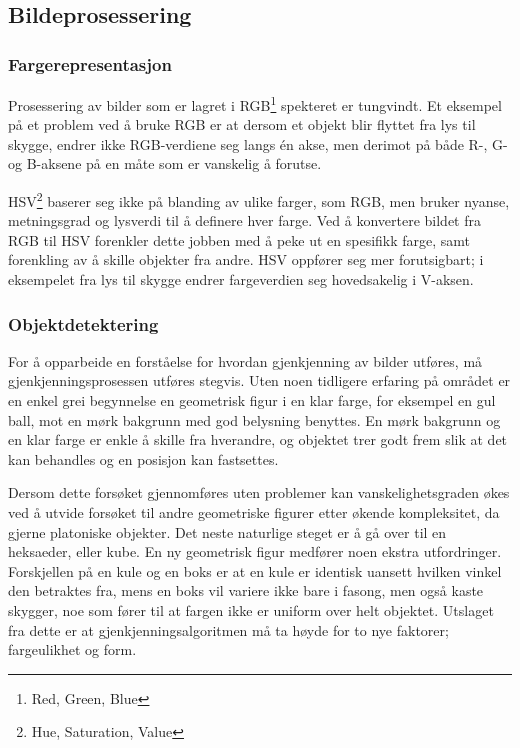 \subsection{Bildeprosessering}

\subsubsection{Fargerepresentasjon}
Prosessering av bilder som er lagret i RGB\footnote{Red, Green, Blue} spekteret er tungvindt. Et eksempel på et problem ved å bruke RGB er at dersom et objekt blir flyttet fra lys til skygge, endrer ikke RGB-verdiene seg langs én akse, men derimot på både R-, G- og B-aksene på en måte som er vanskelig å forutse.

HSV\footnote{Hue, Saturation, Value} baserer seg ikke på blanding av ulike farger, som RGB, men bruker nyanse, metningsgrad og lysverdi til å definere hver farge. Ved å konvertere bildet fra RGB til HSV forenkler dette jobben med å peke ut en spesifikk farge, samt forenkling av å skille objekter fra andre. HSV oppfører seg mer forutsigbart; i eksempelet fra lys til skygge endrer fargeverdien seg hovedsakelig i V-aksen. 

\subsubsection{Objektdetektering}
For å opparbeide en forståelse for hvordan gjenkjenning av bilder utføres, må gjenkjenningsprosessen utføres stegvis. Uten noen tidligere erfaring på området er en enkel grei begynnelse en geometrisk figur i en klar farge, for eksempel en gul ball, mot en mørk bakgrunn med god belysning benyttes. En mørk bakgrunn og en klar farge er enkle å skille fra hverandre, og objektet trer godt frem slik at det kan behandles og en posisjon kan fastsettes.

Dersom dette forsøket gjennomføres uten problemer kan vanskelighetsgraden økes ved å utvide forsøket til andre geometriske figurer etter økende kompleksitet, da gjerne platoniske objekter. Det neste naturlige steget er å gå over til en heksaeder, eller kube. En ny geometrisk figur medfører noen ekstra utfordringer. Forskjellen på en kule og en boks er at en kule er identisk uansett hvilken vinkel den betraktes fra, mens en boks vil variere ikke bare i fasong, men også kaste skygger, noe som fører til at fargen ikke er uniform over helt objektet. Utslaget fra dette er at gjenkjenningsalgoritmen må ta høyde for to nye faktorer; fargeulikhet og form. 

